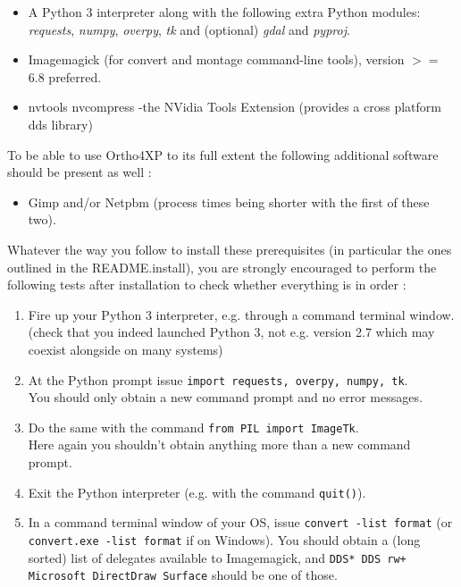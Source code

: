 \documentclass[12pt]{article}
\begin{document}
\begin{itemize}
  \item A Python 3 interpreter along with the following extra Python modules: {\it requests}, {\it numpy}, {\it overpy}, {\it tk} and (optional) {\it gdal} and {\it pyproj}.
  \item Imagemagick (for convert and montage command-line tools), version $>=$ 6.8 preferred.
  \item nvtools nvcompress -the NVidia Tools Extension (provides a cross platform dds library)
\end{itemize}
To be able to use Ortho4XP to its full extent the following additional software should be present as well :
\begin{itemize}
  \item Gimp and/or Netpbm (process times being shorter with the first of these two).
\end{itemize}

Whatever the way you follow to install these prerequisites (in particular the ones outlined in the README.install), you are strongly encouraged to perform the following tests after installation to check whether everything is in order :

\begin{enumerate}
  \item Fire up your Python 3 interpreter, e.g. through a command terminal window.\\
  \hspace*{-1cm}\dbend\hspace*{0.3cm}(check that you indeed launched Python 3, not e.g. version 2.7 which may coexist alongside on many systems)
  \item At the Python prompt issue {\tt import requests, overpy, numpy, tk}.\\
  You should only obtain a new command prompt and no error messages.
  \item Do the same with the command {\tt from PIL import ImageTk}.\\ 
  Here again you shouldn't obtain anything more than a new command prompt.
  \item Exit the Python interpreter (e.g. with the command {\tt quit()}).
  \item In a command terminal window of your OS, issue {\tt convert -list format} (or
  {\tt convert.exe -list format} if on Windows). You should obtain a (long sorted) list of delegates available to Imagemagick, and {\tt DDS* DDS rw+ Microsoft DirectDraw Surface} should be one of those.
\end{enumerate}
\end{document}
